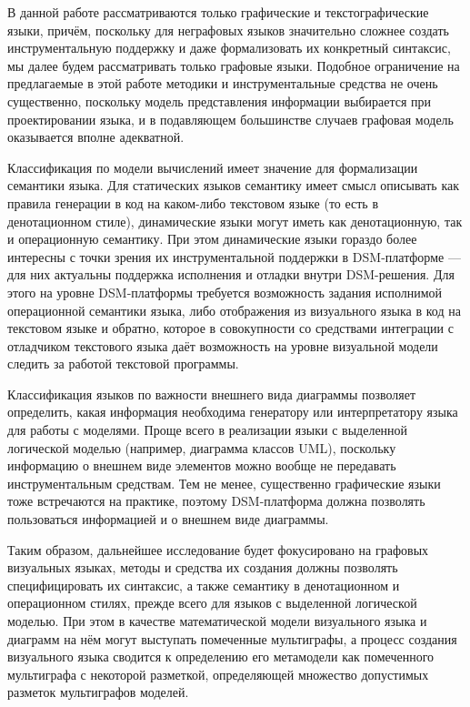 В данной работе рассматриваются только графические и текстографические языки, причём,
поскольку для неграфовых языков значительно сложнее создать инструментальную поддержку
и даже формализовать их конкретный синтаксис, мы далее будем рассматривать только графовые
языки. Подобное ограничение на предлагаемые в этой работе методики и инструментальные средства
не очень существенно, поскольку модель представления информации выбирается при проектировании 
языка, и в подавляющем большинстве случаев графовая модель оказывается вполне адекватной.

Классификация по модели вычислений имеет значение для формализации семантики языка.
Для статических языков семантику имеет смысл описывать как правила генерации в код
на каком-либо текстовом языке (то есть в денотационном стиле), динамические языки
могут иметь как денотационную, так и операционную семантику. При этом динамические языки
гораздо более интересны с точки зрения их инструментальной поддержки в \ac{DSM}-платформе ---
для них актуальны поддержка исполнения и отладки внутри \ac{DSM}-решения. Для этого на
уровне \ac{DSM}-платформы требуется возможность задания исполнимой операционной семантики
языка, либо отображения из визуального языка в код на текстовом языке и обратно, которое
в совокупности со средствами интеграции с отладчиком текстового языка даёт возможность на уровне
визуальной модели следить за работой текстовой программы.

Классификация языков по важности внешнего вида диаграммы позволяет определить, какая
информация необходима генератору или интерпретатору языка для работы с моделями. Проще всего 
в реализации языки с выделенной логической моделью (например, диаграмма классов \ac{UML}),
поскольку информацию о внешнем виде элементов можно вообще не передавать инструментальным средствам.
Тем не менее, существенно графические языки тоже встречаются на практике, поэтому \ac{DSM}-платформа
должна позволять пользоваться информацией и о внешнем виде диаграммы.

Таким образом, дальнейшее исследование будет фокусировано на графовых визуальных языках,
методы и средства их создания должны позволять специфицировать их синтаксис, а также
семантику в денотационном и операционном стилях, прежде всего для языков с выделенной
логической моделью. При этом в качестве математической модели визуального языка и диаграмм
на нём могут выступать помеченные мультиграфы, а процесс создания визуального языка сводится к 
определению его метамодели как помеченного мультиграфа с некоторой разметкой, определяющей
множество допустимых разметок мультиграфов моделей.
